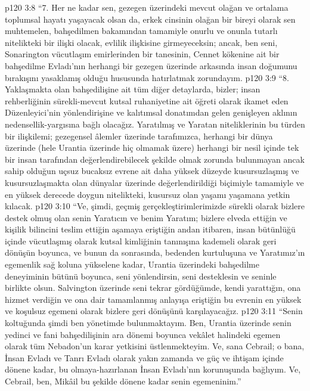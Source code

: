 \vs p120 3:8 “7. Her ne kadar sen, gezegen üzerindeki mevcut olağan ve ortalama toplumsal hayatı yaşayacak olsan da, erkek cinsinin olağan bir bireyi olarak sen muhtemelen, bahşedilmen bakamından tamamiyle onurlu ve onunla tutarlı nitelikteki bir ilişki olacak, evlilik ilişkisine girmeyeceksin; ancak, ben seni, Sonarington vücutlaşım emirlerinden bir tanesinin, Cennet kökenine ait bir bahşedilme Evladı’nın herhangi bir gezegen üzerinde arkasında insan doğumunu bırakışını yasaklamış olduğu hususunda hatırlatmak zorundayım.
\vs p120 3:9 “8. Yaklaşmakta olan bahşedilişine ait tüm diğer detaylarda, bizler; insan rehberliğinin sürekli\hyp{}mevcut kutsal ruhaniyetine ait öğreti olarak ikamet eden Düzenleyici’nin yönlendirişine ve kalıtımsal donatımdan gelen genişleyen aklının nedensellik\hyp{}yargısına bağlı olacağız. Yaratılmış ve Yaratan niteliklerinin bu türden bir ilişkilemi; gezegensel âlemler üzerinde tarafımızca, herhangi bir dünya üzerinde (hele Urantia üzerinde hiç olmamak üzere) herhangi bir nesil içinde tek bir insan tarafından değerlendirebilecek şekilde olmak zorunda bulunmayan ancak sahip olduğun uçsuz bucaksız evrene ait daha yüksek düzeyde kusursuzlaşmış ve kusursuzlaşmakta olan dünyalar üzerinde değerlendirildiği biçimiyle tamamiyle ve en yüksek derecede doygun nitelikteki, kusursuz olan yaşamı yaşamana yetkin kılacak.
\vs p120 3:10 “Ve, şimdi, geçmiş gerçekleştirimlerimizde sürekli olarak bizlere destek olmuş olan senin Yaratıcın ve benim Yaratım; bizlere elveda ettiğin ve kişilik bilincini teslim ettiğin aşamaya eriştiğin andan itibaren, insan bütünlüğü içinde vücutlaşmış olarak kutsal kimliğinin tanınışına kademeli olarak geri dönüşün boyunca, ve bunun da sonrasında, bedenden kurtuluşuna ve Yaratımız’ın egemenlik sağ koluna yükselene kadar, Urantia üzerindeki bahşedilme deneyiminin bütünü boyunca, seni yönlendirsin, seni desteklesin ve seninle birlikte olsun. Salvington üzerinde seni tekrar gördüğümde, kendi yarattığın, ona hizmet verdiğin ve ona dair tamamlanmış anlayışa eriştiğin bu evrenin en yüksek ve koşulsuz egemeni olarak bizlere geri dönüşünü karşılayacağız.
\vs p120 3:11 “Senin koltuğunda şimdi ben yönetimde bulunmaktayım. Ben, Urantia üzerinde senin yedinci ve fani bahşedilişinin ara dönemi boyunca vekâlet halindeki egemen olarak tüm Nebadon’un karar yetkisini üstlenmekteyim. Ve, sana Cebrail; o bana, İnsan Evladı ve Tanrı Evladı olarak yakın zamanda ve güç ve ihtişam içinde dönene kadar, bu olmaya\hyp{}hazırlanan İnsan Evladı’nın korunuşunda bağlıyım. Ve, Cebrail, ben, Mikâil bu şekilde dönene kadar senin egemeninim.”
\separatorline
